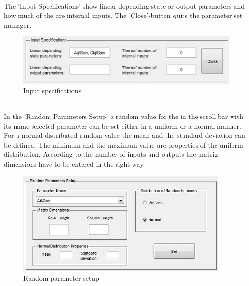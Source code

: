 \documentclass[12pt]{report}
\begin{document}
\\
The 'Input Specifications' show linear depending state or output parameters and how much of the are internal inputs. The 'Close'-button quits the parameter set manager.\\
\begin{figure}[h]
\centering
\includegraphics[scale=.7]{inputspec}
\caption{Input specifications}
\label{FIG:abb17}
\end{figure}
\\
In the 'Random Parameters Setup' a random value for the in the scroll bar with its name selected parameter can be set either in a uniform or a normal manner. For a normal distributed random value the mean and the standard deviation can be defined. The minimum and the maximum value are properties of the uniform distribution. According to the number of inputs and outputs the matrix dimensions have to be entered in the right way.\\
\begin{figure}
\centering
\includegraphics[scale=.7]{randomparaset}
\caption{Random parameter setup}
\label{FIG:abb18}
\end{figure}
\\
\end{document}
